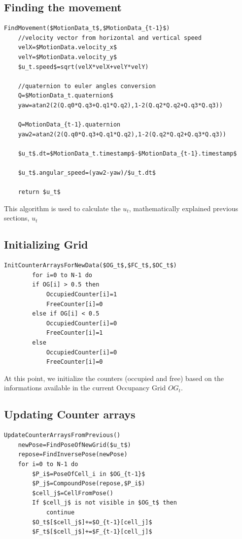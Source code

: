 \subsection{Finding the movement}

\begin{lstlisting}[label=al:movement,mathescape=true,caption={Find the movement of the vehicle}]
FindMovement($MotionData_t$,$MotionData_{t-1}$)
	//velocity vector from horizontal and vertical speed	
	velX=$MotionData.velocity_x$
	velY=$MotionData.velocity_y$
	$u_t.speed$=sqrt(velX*velX+velY*velY)
	
	//quaternion to euler angles conversion	
	Q=$MotionData_t.quaternion$
	yaw=atan2(2(Q.q0*Q.q3+Q.q1*Q.q2),1-2(Q.q2*Q.q2+Q.q3*Q.q3))	

	Q=MotionData_{t-1}.quaternion
	yaw2=atan2(2(Q.q0*Q.q3+Q.q1*Q.q2),1-2(Q.q2*Q.q2+Q.q3*Q.q3))	
	
	$u_t$.dt=$MotionData_t.timestamp$-$MotionData_{t-1}.timestamp$
	
	$u_t$.angular_speed=(yaw2-yaw)/$u_t.dt$
	
	return $u_t$
\end{lstlisting}

This algorithm is used to calculate the $u_t$, mathematically explained previous sections, $u_t$ 

\subsection{Initializing Grid}

\begin{lstlisting}[label=al:initializeGrid,mathescape=true,caption={Initialization of the grid}]
InitCounterArraysForNewData($OG_t$,$FC_t$,$OC_t$)
		for i=0 to N-1 do
		if OG[i] > 0.5 then 
			OccupiedCounter[i]=1
			FreeCounter[i]=0
		else if OG[i] < 0.5
			OccupiedCounter[i]=0
			FreeCounter[i]=1
		else
			OccupiedCounter[i]=0
			FreeCounter[i]=0
\end{lstlisting}

At this point, we initialize the counters (occupied and free) based on the informations available in the current Occupancy Grid $OG_t$.

\subsection{Updating Counter arrays}

\begin{lstlisting}[label=al:updatecounter,mathescape=true,caption={Update counter arrays}]
UpdateCounterArraysFromPrevious()
	newPose=FindPoseOfNewGrid($u_t$)
	repose=FindInversePose(newPose)
	for i=0 to N-1 do
		$P_i$=PoseOfCell_i in $OG_{t-1}$
		$P_j$=CompoundPose(repose,$P_i$)
		$cell_j$=CellFromPose()
		If $cell_j$ is not visible in $OG_t$ then
			continue
		$O_t$[$cell_j$]+=$O_{t-1}[cell_j]$
		$F_t$[$cell_j$]+=$F_{t-1}[cell_j]$
\end{lstlisting}

